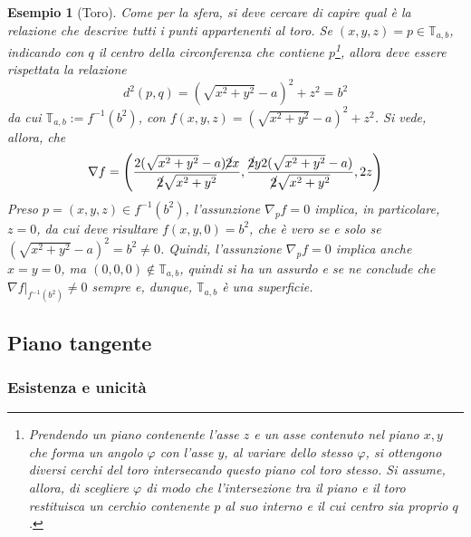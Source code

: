 \documentclass[12pt]{scrartcl}
\theoremstyle{style}
\newtheorem{esempio}{Esempio}[section]
\numberwithin{equation}{subsection}
\begin{document}
\begin{esempio}
	[Toro]
	Come per la sfera, si deve cercare di capire qual \`e la relazione che descrive tutti i punti appartenenti al toro.
	Se $(x,y,z) = p \in \mathbb{T}_{a,b} $, indicando con $q$ il centro della circonferenza che contiene $p$\footnote{Prendendo un piano contenente l'asse $z$ e un asse contenuto nel piano $x,y$ che forma un angolo $\varphi $ con l'asse $y$, al variare dello stesso $\varphi $, si ottengono diversi cerchi del toro intersecando questo piano col toro stesso. 
	Si assume, allora, di scegliere $\varphi $ di modo che l'intersezione tra il piano e il toro restituisca un cerchio contenente $p$ al suo interno e il cui centro sia proprio $q$.}, allora deve essere rispettata la relazione
	\[
	d^2(p,q) = (\sqrt{x^2 + y^2} -a)^2 + z^2 = b^2
	\] 
	da cui $\mathbb{T}_{a,b} :=f^{-1}(b^2)$, con $f(x,y,z) = (\sqrt{x^2 + y^2} -a)^2 + z^2$.
	Si vede, allora, che
	\[
		\nabla f = \left(\frac{2 (\sqrt{x^2 + y^2} -a) \cancel{2}x}{\cancel{2} \sqrt{x^2 +y^2} }, \frac{\cancel{2} y 2 (\sqrt{x^2 + y^2} - a)}{\cancel{2} \sqrt{x^2 + y^2} } ,2z\right) 
	\] 
	Preso $p = (x,y,z) \in f^{-1}(b^2)$, l'assunzione $\nabla _pf = 0$ implica, in particolare, $z=0$, da cui deve risultare $f(x,y,0) = b^2$, che \`e vero se e solo se $(\sqrt{x^2 + y^2} -a)^2 = b^2 \neq 0$.
	Quindi, l'assunzione $\nabla _p f= 0$ implica anche $x=y=0$, ma $(0,0,0) \not \in \mathbb{T}_{a,b} $, quindi si ha un assurdo e se ne conclude che $\nabla f |_{f^{-1}(b^2)} \neq 0 $ sempre e, dunque, $\mathbb{T}_{a,b} $ \`e una superficie.
\end{esempio}
\subsection{Piano tangente}
\subsubsection{Esistenza e unicit\`a}
\end{document}
